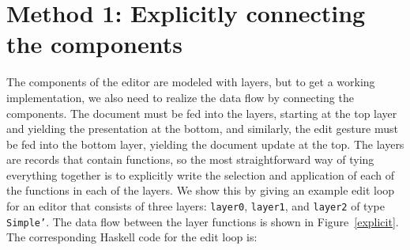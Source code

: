 \section{Method 1: Explicitly connecting the components}
\label{sectsimple}
\par The components of the editor are modeled with layers, but to get a
      working implementation, we also need to realize the data flow by connecting the
      components. The document must be fed into the layers, starting at the top layer
      and yielding the presentation at the bottom, and similarly, the edit gesture
      must be fed into the bottom layer, yielding the document update at the top. The
      layers are records that contain functions, so the most straightforward way of
      tying everything together is to explicitly write the selection and application
      of each of the functions in each of the layers. We show this by giving an
      example edit loop for an editor that consists of three layers: \texttt{layer0},
      \texttt{layer1}, and \texttt{layer2} of type \texttt{Simple'}. The data flow
      between the layer functions is shown in Figure~\ref{explicit}.
      The corresponding Haskell code for the edit loop is:
